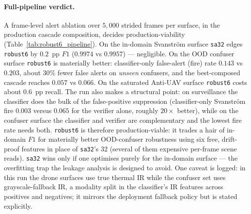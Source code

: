 \documentclass[12pt,a4paper,oneside,openright]{book}
\begin{document}
\paragraph{Full-pipeline verdict.}
A frame-level alert ablation over $5{,}000$ strided frames per surface, in the production cascade composition, decides production-viability (Table~\ref{tab:robust6_pipeline}). On the in-domain Svanstr\"om surface \texttt{sa32} edges \texttt{robust6} by $0.2$~pp $F1$ ($0.9974$ vs $0.9957$) --- negligible. On the OOD confuser surface \texttt{robust6} is materially better: classifier-only false-alert (fire) rate $0.143$ vs $0.203$, about $30\%$ fewer false alerts on \emph{unseen} confusers, and the best-composed cascade reaches $0.057$ vs $0.066$. On the saturated Anti-UAV surface \texttt{robust6} costs about $0.6$~pp recall. The run also makes a structural point: on surveillance the classifier does the bulk of the false-positive suppression (classifier-only Svanstr\"om fire $0.003$ versus $0.065$ for the verifier alone, roughly $20\times$ better), while on the confuser surface the classifier and verifier are complementary and the lowest fire rate needs both. \texttt{robust6} is therefore production-viable: it trades a hair of in-domain $F1$ for materially better OOD-confuser robustness using six free, drift-proof features in place of \texttt{sa32}'s $32$ (several of them expensive per-frame scene reads). \texttt{sa32} wins only if one optimises purely for the in-domain surface --- the overfitting trap the leakage analysis is designed to avoid. One caveat is logged: in this run the drone surfaces use true thermal IR while the confuser set uses grayscale-fallback IR, a modality split in the classifier's IR features across positives and negatives; it mirrors the deployment fallback policy but is stated explicitly.
\end{document}
